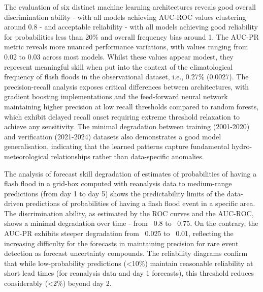 \documentclass[nhess, manuscript]{copernicus}
\begin{document}
The evaluation of six distinct machine learning architectures reveals good overall discrimination ability - with all models achieving AUC-ROC values clustering around 0.8 - and acceptable reliability - with all models achieving good reliability for probabilities less than 20\% and overall frequency bias around 1. The AUC-PR metric reveals more nuanced performance variations, with values ranging from 0.02 to 0.03 across most models. Whilst these values appear modest, they represent meaningful skill when put into the context of the climatological frequency of flash floods in the observational dataset, i.e., 0.27\% (0.0027). The precision-recall analysis exposes critical differences between architectures, with gradient boosting implementations and the feed-forward neural network maintaining higher precision at low recall thresholds compared to random forests, which exhibit delayed recall onset requiring extreme threshold relaxation to achieve any sensitivity. The minimal degradation between training (2001-2020) and verification (2021-2024) datasets also demonstrates a good model generalisation, indicating that the learned patterns capture fundamental hydro-meteorological relationships rather than data-specific anomalies.

The analysis of forecast skill degradation of estimates of probabilities of having a flash flood in a grid-box computed with reanalysis data to medium-range predictions (from day 1 to day 5) shows the predictability limits of the data-driven predictions of probabilities of having a flash flood event in a specific area. The discrimination ability, as estimated by the ROC curves and the AUC-ROC, shows a minimal degradation over time - from ~0.8 to ~0.75. On the contrary, the AUC-PR exhibits steeper degradation from ~0.025 to ~0.01, reflecting the increasing difficulty for the forecasts in maintaining precision for rare event detection as forecast uncertainty compounds. The reliability diagrams confirm that while low-probability predictions (<10\%) maintain reasonable reliability at short lead times (for reanalysis data and day 1 forecasts), this threshold reduces considerably (<2\%) beyond day 2.
\end{document}
